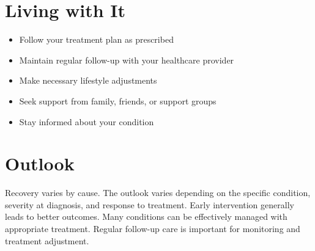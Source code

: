 \section{Living with It}
\begin{itemize}[noitemsep]
  \item Follow your treatment plan as prescribed
  \item Maintain regular follow-up with your healthcare provider
  \item Make necessary lifestyle adjustments
  \item Seek support from family, friends, or support groups
  \item Stay informed about your condition
\end{itemize}
\section{Outlook}
Recovery varies by cause. The outlook varies depending on the specific condition, severity at diagnosis, and response to treatment. Early intervention generally leads to better outcomes. Many conditions can be effectively managed with appropriate treatment. Regular follow-up care is important for monitoring and treatment adjustment.

